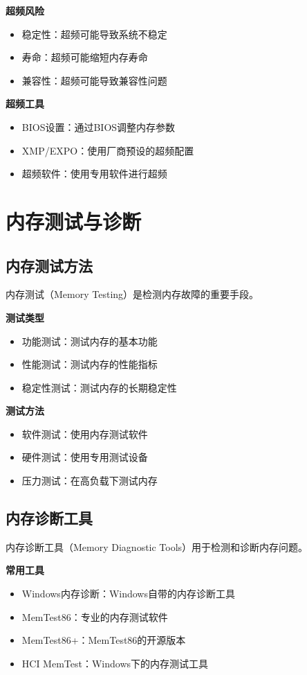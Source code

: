 \documentclass{article}
\begin{document}
\textbf{超频风险}
\begin{itemize}
    \item 稳定性：超频可能导致系统不稳定
    \item 寿命：超频可能缩短内存寿命
    \item 兼容性：超频可能导致兼容性问题
\end{itemize}

\textbf{超频工具}
\begin{itemize}
    \item BIOS设置：通过BIOS调整内存参数
    \item XMP/EXPO：使用厂商预设的超频配置
    \item 超频软件：使用专用软件进行超频
\end{itemize}

\section{内存测试与诊断}

\subsection{内存测试方法}

内存测试（Memory Testing）是检测内存故障的重要手段。

\textbf{测试类型}
\begin{itemize}
    \item 功能测试：测试内存的基本功能
    \item 性能测试：测试内存的性能指标
    \item 稳定性测试：测试内存的长期稳定性
\end{itemize}

\textbf{测试方法}
\begin{itemize}
    \item 软件测试：使用内存测试软件
    \item 硬件测试：使用专用测试设备
    \item 压力测试：在高负载下测试内存
\end{itemize}

\subsection{内存诊断工具}

内存诊断工具（Memory Diagnostic Tools）用于检测和诊断内存问题。

\textbf{常用工具}
\begin{itemize}
    \item Windows内存诊断：Windows自带的内存诊断工具
    \item MemTest86：专业的内存测试软件
    \item MemTest86+：MemTest86的开源版本
    \item HCI MemTest：Windows下的内存测试工具
\end{itemize}
\end{document}
